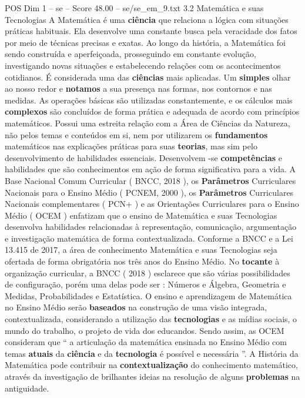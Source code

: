 \begin{textsample}{POS Dim 1 – se – Score 48.00 – se/se\_em\_9.txt}  \label{ex:f1_pos_084}
3.2 Matemática e suas Tecnologias A Matemática é uma \textbf{ciência} que relaciona a lógica com situações práticas habituais.
Ela desenvolve uma constante busca pela veracidade dos fatos por meio de técnicas precisas e exatas.
Ao longo da história, a Matemática foi sendo construída e aperfeiçoada, prosseguindo em constante evolução, investigando novas situações e estabelecendo relações com os acontecimentos cotidianos.
É considerada uma das \textbf{ciências} mais aplicadas.
Um \textbf{simples} olhar ao nosso redor e \textbf{notamos} a sua presença nas formas, nos contornos e nas medidas.
As operações básicas são utilizadas constantemente, e os cálculos mais \textbf{complexos} são concluídos de forma prática e adequada de acordo com princípios matemáticos.
Possui uma estreita relação com a Área de Ciências da Natureza, não pelos temas e conteúdos em si, nem por utilizarem os \textbf{fundamentos} matemáticos nas explicações práticas para suas \textbf{teorias}, mas sim pelo desenvolvimento de habilidades essenciais.
Desenvolvem -se \textbf{competências} e habilidades que são conhecimentos em ação de forma significativa para a vida.
A Base Nacional Comum Curricular ( BNCC, 2018 ), os \textbf{Parâmetros} Curriculares Nacionais para o Ensino Médio ( PCNEM, 2000 ), os \textbf{Parâmetros} Curriculares Nacionais complementares ( PCN+ ) e as Orientações Curriculares para o Ensino Médio ( OCEM ) enfatizam que o ensino de Matemática e suas Tecnologias desenvolva habilidades relacionadas à representação, comunicação, argumentação e investigação matemática de forma contextualizada.
Conforme a BNCC e a Lei 13.415 de 2017, a área de conhecimento Matemática e suas Tecnologias seja ofertada de forma obrigatória nos três anos do Ensino Médio.
No \textbf{tocante} à organização curricular, a BNCC ( 2018 ) esclarece que são várias possibilidades de configuração, porém uma delas pode ser : Números e Álgebra, Geometria e Medidas, Probabilidades e Estatística.
O ensino e aprendizagem de Matemática no Ensino Médio serão \textbf{baseados} na construção de uma visão integrada, contextualizada, considerando a utilização das \textbf{tecnologias} e as mídias sociais, o mundo do trabalho, o projeto de vida dos educandos.
Sendo assim, as OCEM consideram que “ a articulação da matemática ensinada no Ensino Médio com temas \textbf{atuais} da \textbf{ciência} e da \textbf{tecnologia} é possível e necessária ”.
A História da Matemática pode contribuir na \textbf{contextualização} do conhecimento matemático, através da investigação de brilhantes ideias na resolução de alguns \textbf{problemas} na antiguidade.

\end{textsample}
